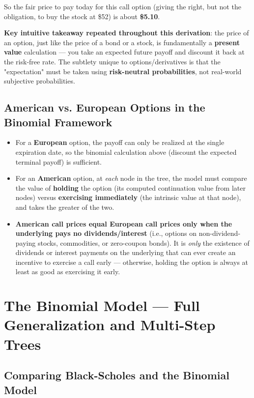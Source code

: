 \documentclass[12pt,openany]{book}
\theoremstyle{definition}
\theoremstyle{remark}
\begin{document}
So the fair price to pay today for this call option (giving the right, but not the obligation, to buy the stock at \$52) is about \textbf{\$5.10}.

\textbf{Key intuitive takeaway repeated throughout this derivation}: the price of an option, just like the price of a bond or a stock, is fundamentally a \textbf{present value} calculation — you take an expected future payoff and discount it back at the risk-free rate. The subtlety unique to options/derivatives is that the "expectation" must be taken using \textbf{risk-neutral probabilities}, not real-world subjective probabilities.

\subsection{American vs. European Options in the Binomial Framework}

\begin{itemize}
\item For a \textbf{European} option, the payoff can only be realized at the single expiration date, so the binomial calculation above (discount the expected terminal payoff) is sufficient.
\item For an \textbf{American} option, at \emph{each} node in the tree, the model must compare the value of \textbf{holding} the option (its computed continuation value from later nodes) versus \textbf{exercising immediately} (the intrinsic value at that node), and takes the greater of the two.
\item \textbf{American call prices equal European call prices only when the underlying pays no dividends/interest} (i.e., options on non-dividend-paying stocks, commodities, or zero-coupon bonds). It is \emph{only} the existence of dividends or interest payments on the underlying that can ever create an incentive to exercise a call early — otherwise, holding the option is always at least as good as exercising it early.
\end{itemize}

\section{The Binomial Model — Full Generalization and Multi-Step Trees}

\subsection{Comparing Black-Scholes and the Binomial Model}
\end{document}
